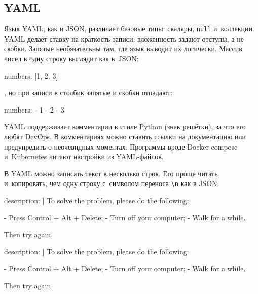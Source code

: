 \subsection{YAML}


Язык YAML, как и JSON, различает базовые типы: скаляры, \verb|null|
и~коллекции. YAML делает ставку на краткость записи: вложенность задают отступы,
а не скобки. Запятые необязательны там, где язык выводит их логически. Массив
чисел в одну строку выглядит как в~JSON:


\begin{english}
  \begin{yaml}
numbers: [1, 2, 3]
  \end{yaml}
\end{english}

\noindent
, но при записи в столбик запятые и скобки отпадают:

\begin{english}
  \begin{yaml}
numbers:
  - 1
  - 2
  - 3
  \end{yaml}
\end{english}

YAML поддерживает комментарии в стиле Python (знак решётки), за что его любят
DevOps. В комментариях можно ставить ссылки на документацию или предупредить о
неочевидных моментах. Программы вроде Docker-compose и~Kubernetes читают
настройки из YAML-файлов.

В YAML можно записать текст в несколько строк. Его проще читать и~копировать,
чем одну строку с~символом переноса \verb|\n| как в JSON.

\ifx\DEVICETYPE\MOBILE

\begin{english}
  \begin{yaml}
description: |
  To solve the problem,
  please do the following:

  - Press Control + Alt + Delete;
  - Turn off your computer;
  - Walk for a while.

  Then try again.
  \end{yaml}
\end{english}

\else

\begin{english}
  \begin{yaml}
description: |
  To solve the problem, please do the following:

  - Press Control + Alt + Delete;
  - Turn off your computer;
  - Walk for a while.

  Then try again.
  \end{yaml}
\end{english}

